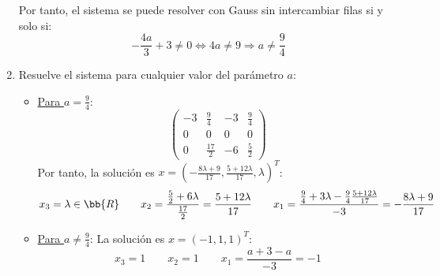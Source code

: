 \begin{ejercicio}
\begin{enumerate}
    Por tanto, el sistema se puede resolver con Gauss sin intercambiar filas si y solo si:
    $$-\frac{4a}{3}+3 \neq 0 \Longleftrightarrow 4a \neq 9 \Longrightarrow a\neq \frac{9}{4}$$

    \item Resuelve el sistema para cualquier valor del parámetro $a$:
    \begin{itemize}
        \item \underline{Para $a=\frac{9}{4}$}:
            \begin{equation*}
                \left(\begin{array}{ccc|c}
                    -3 & \frac{9}{4} & -3 & \frac{9}{4}\\
                     0 & 0 & 0 & 0\\
                     0 & \frac{17}{2} & -6 & \frac{5}{2}
                \end{array}
                \right)
            \end{equation*}
            Por tanto, la solución es $x=(-\frac{8\lambda+9}{17}, \frac{5+12\lambda}{17}, \lambda)^T$:
            \begin{equation*}
                x_3 = \lambda\in \bb{R} \qquad x_2 = \frac{\frac{5}{2}+6\lambda}{\frac{17}{2}} = \frac{5+12\lambda}{17} \qquad x_1 = \frac{\frac{9}{4}+3\lambda -\frac{9}{4}\frac{5+12\lambda}{17}}{-3} = -\frac{8\lambda+9}{17}
            \end{equation*}

        \item \underline{Para $a\neq\frac{9}{4}$}:
            La solución es $x=(-1,1,1)^T$:
            \begin{equation*}
                x_3 = 1 \qquad x_2 = 1 \qquad x_1 = \frac{a+3-a}{-3} = -1
            \end{equation*}
            
    \end{itemize}


\end{enumerate}
\end{ejercicio}

